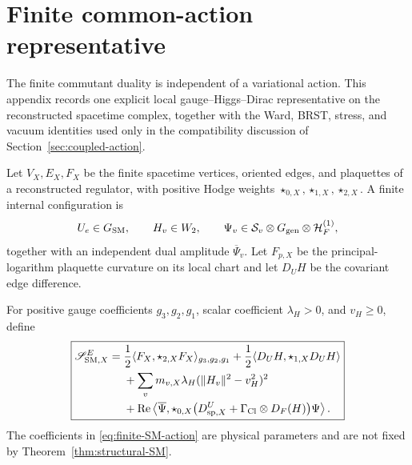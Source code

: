 \documentclass[11pt]{article}
\theoremstyle{definition}
\theoremstyle{remark}
\newcommand{\norm}[1]{\lVert#1\rVert}
\begin{document}
\section{Finite common-action representative}
\label{app:finite-common-action}

The finite commutant duality is independent of a variational action.  This
appendix records one explicit local gauge--Higgs--Dirac representative on the
reconstructed spacetime complex, together with the Ward, BRST, stress, and
vacuum identities used only in the compatibility discussion of
Section~\ref{sec:coupled-action}.

Let $V_X,E_X,F_X$ be the finite spacetime vertices, oriented edges, and
plaquettes of a reconstructed regulator, with positive Hodge weights
$\star_{0,X},\star_{1,X},\star_{2,X}$.  A finite internal configuration is
\[
U_e\in G_{\rm SM},
\qquad
H_v\in W_2,
\qquad
\Psi_v\in\mathcal S_v\otimes G_{\rm gen}\otimes\mathcal H_F^{(1)},
\]
together with an independent dual amplitude $\overline\Psi_v$.
Let $F_{p,X}$ be the principal-logarithm plaquette curvature on its local
chart and let $D_UH$ be the covariant edge difference.

For positive gauge coefficients $g_3,g_2,g_1$, scalar coefficient
$\lambda_H>0$, and $v_H\ge0$, define
\begin{equation}
\boxed{
\begin{aligned}
\mathscr S_{{\rm SM},X}^{E}
={}&
\frac12\langle F_X,\star_{2,X}F_X\rangle_{g_3,g_2,g_1}
+\frac12\langle D_UH,\star_{1,X}D_UH\rangle\\
&+
\sum_{v}m_{v,X}\lambda_H
(\norm{H_v}^2-v_H^2)^2\\
&+
\operatorname{Re}
\left\langle
\overline\Psi,
\star_{0,X}
\bigl(
D_{{\rm sp},X}^{U}
+\Gamma_{\rm Cl}\otimes D_F(H)
\bigr)\Psi
\right\rangle .
\end{aligned}}
\label{eq:finite-SM-action}
\end{equation}
The coefficients in \eqref{eq:finite-SM-action} are physical parameters and
are not fixed by Theorem~\ref{thm:structural-SM}.
\end{document}
